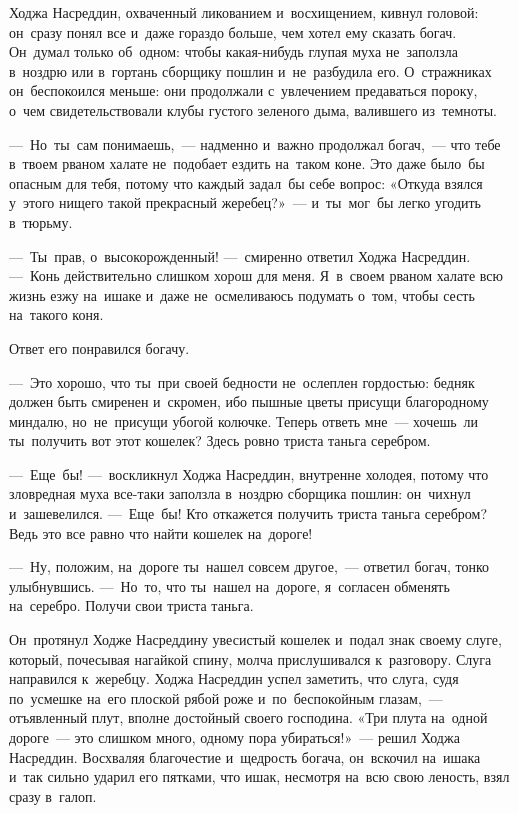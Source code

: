 \documentclass[12pt,a4paper]{book}
\begin{document}
Ходжа Насреддин, охваченный ликованием и~восхищением, кивнул головой: он~сразу понял все и~даже гораздо больше, чем хотел ему сказать богач. Он~думал только об~одном: чтобы какая-нибудь глупая муха не~заползла в~ноздрю или в~гортань сборщику пошлин и~не~разбудила его. О~стражниках он~беспокоился меньше: они продолжали с~увлечением предаваться пороку, о~чем свидетельствовали клубы густого зеленого дыма, валившего из~темноты.

—~Но~ты~сам понимаешь,~— надменно и~важно продолжал богач,~— что тебе в~твоем рваном халате не~подобает ездить на~таком коне. Это даже было~бы опасным для тебя, потому что каждый задал~бы себе вопрос: «Откуда взялся у~этого нищего такой прекрасный жеребец?»~— и~ты~мог~бы легко угодить в~тюрьму.

—~Ты~прав, о~высокорожденный! —~смиренно ответил Ходжа Насреддин. —~Конь действительно слишком хорош для меня. Я~в~своем рваном халате всю жизнь езжу на~ишаке и~даже не~осмеливаюсь подумать о~том, чтобы сесть на~такого коня.

Ответ его понравился богачу.

—~Это хорошо, что ты~при своей бедности не~ослеплен гордостью: бедняк должен быть смиренен и~скромен, ибо пышные цветы присущи благородному миндалю, но~не~присущи убогой колючке. Теперь ответь мне~— хочешь~ли ты~получить вот этот кошелек? Здесь ровно триста таньга серебром.

—~Еще~бы! —~воскликнул Ходжа Насреддин, внутренне холодея, потому что зловредная муха все-таки заползла в~ноздрю сборщика пошлин: он~чихнул и~зашевелился. —~Еще~бы! Кто откажется получить триста таньга серебром? Ведь это все равно что найти кошелек на~дороге!

—~Ну, положим, на~дороге ты~нашел совсем другое,~— ответил богач, тонко улыбнувшись. —~Но~то, что ты~нашел на~дороге, я~согласен обменять на~серебро. Получи свои триста таньга.

Он~протянул Ходже Насреддину увесистый кошелек и~подал знак своему слуге, который, почесывая нагайкой спину, молча прислушивался к~разговору. Слуга направился к~жеребцу. Ходжа Насреддин успел заметить, что слуга, судя по~усмешке на~его плоской рябой роже и~по~беспокойным глазам,~— отъявленный плут, вполне достойный своего господина. «Три плута на~одной дороге~— это слишком много, одному пора убираться!»~— решил Ходжа Насреддин. Восхваляя благочестие и~щедрость богача, он~вскочил на~ишака и~так сильно ударил его пятками, что ишак, несмотря на~всю свою леность, взял сразу в~галоп.
\end{document}
